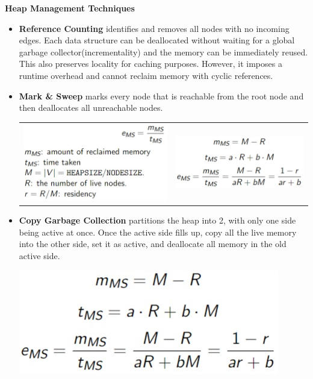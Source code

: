 \begin{center}
    \textbf{Heap Management Techniques}
\end{center}
\begin{itemize}
    \item \textbf{Reference Counting} identifies and removes all nodes with no incoming edges. Each data structure can be deallocated without waiting for a global garbage collector(incrementality) and the memory can be immediately reused. This also preserves locality for caching purposes. However, it imposes a runtime overhead and cannot reclaim memory with cyclic references.
    \item \textbf{Mark \& Sweep} marks every node that is reachable from the root node and then deallocates all unreachable nodes. \\
    \begin{center}\begin{tabular}{ c c }
        \includegraphics[scale=0.5]{images/mark n sweep 1.jpg} & \includegraphics[scale=0.5]{images/mark n sweep 2.jpg} 
    \end{tabular}\end{center}
    \item \textbf{Copy Garbage Collection} partitions the heap into 2, with only one side being active at once. Once the active side fills up, copy all the live memory into the other side, set it as active, and deallocate all memory in the old active side.
    \begin{center}
        \includegraphics[scale=0.5]{images/copy garbage collection.jpg}
    \end{center}


\end{itemize}
